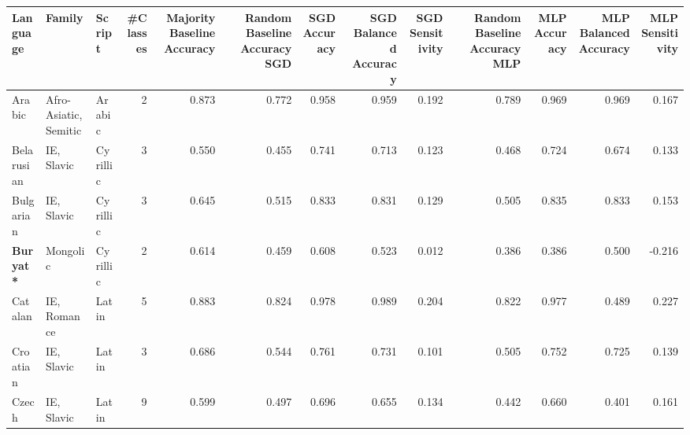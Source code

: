 \begin{tabular}{lllrrrrrrrrrr}
\toprule
                       Language &                          Family &     Script &  #Classes &  Majority Baseline Accuracy &  Random Baseline Accuracy SGD &  SGD Accuracy &  SGD Balanced Accuracy &  SGD Sensitivity &  Random Baseline Accuracy MLP &  MLP Accuracy &  MLP Balanced Accuracy &  MLP Sensitivity \\
\midrule
                         Arabic &           Afro-Asiatic, Semitic &     Arabic &         2 &                       0.873 &                         0.772 &         0.958 &                  0.959 &            0.192 &                         0.789 &         0.969 &                  0.969 &            0.167 \\
                     Belarusian &                      IE, Slavic &   Cyrillic &         3 &                       0.550 &                         0.455 &         0.741 &                  0.713 &            0.123 &                         0.468 &         0.724 &                  0.674 &            0.133 \\
                      Bulgarian &                      IE, Slavic &   Cyrillic &         3 &                       0.645 &                         0.515 &         0.833 &                  0.831 &            0.129 &                         0.505 &         0.835 &                  0.833 &            0.153 \\
               \textbf{Buryat*} &                        Mongolic &   Cyrillic &         2 &                       0.614 &                         0.459 &         0.608 &                  0.523 &            0.012 &                         0.386 &         0.386 &                  0.500 &           -0.216 \\
                        Catalan &                     IE, Romance &      Latin &         5 &                       0.883 &                         0.824 &         0.978 &                  0.989 &            0.204 &                         0.822 &         0.977 &                  0.489 &            0.227 \\
                       Croatian &                      IE, Slavic &      Latin &         3 &                       0.686 &                         0.544 &         0.761 &                  0.731 &            0.101 &                         0.505 &         0.752 &                  0.725 &            0.139 \\
                          Czech &                      IE, Slavic &      Latin &         9 &                       0.599 &                         0.497 &         0.696 &                  0.655 &            0.134 &                         0.442 &         0.660 &                  0.401 &            0.161 \\

\end{tabular}

